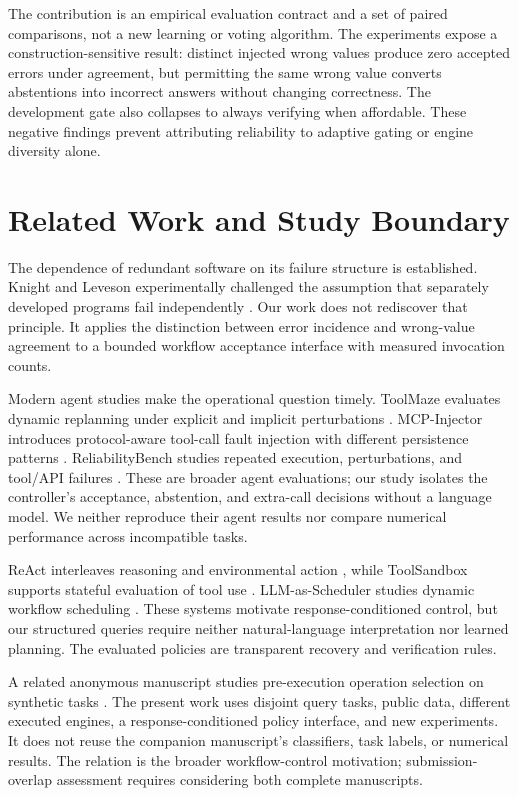 \documentclass{svproc}
\begin{document}
The contribution is an empirical evaluation contract and a set of paired comparisons, not a new learning or voting algorithm. The experiments expose a construction-sensitive result: distinct injected wrong values produce zero accepted errors under agreement, but permitting the same wrong value converts abstentions into incorrect answers without changing correctness. The development gate also collapses to always verifying when affordable. These negative findings prevent attributing reliability to adaptive gating or engine diversity alone.

\section{Related Work and Study Boundary}
The dependence of redundant software on its failure structure is established. Knight and Leveson experimentally challenged the assumption that separately developed programs fail independently \cite{knight1986}. Our work does not rediscover that principle. It applies the distinction between error incidence and wrong-value agreement to a bounded workflow acceptance interface with measured invocation counts.

Modern agent studies make the operational question timely. ToolMaze evaluates dynamic replanning under explicit and implicit perturbations \cite{toolmaze2026}. MCP-Injector introduces protocol-aware tool-call fault injection with different persistence patterns \cite{mcp2026}. ReliabilityBench studies repeated execution, perturbations, and tool/API failures \cite{reliability2026}. These are broader agent evaluations; our study isolates the controller's acceptance, abstention, and extra-call decisions without a language model. We neither reproduce their agent results nor compare numerical performance across incompatible tasks.

ReAct interleaves reasoning and environmental action \cite{yao2023react}, while ToolSandbox supports stateful evaluation of tool use \cite{lu2025toolsandbox}. LLM-as-Scheduler studies dynamic workflow scheduling \cite{xiang2026scheduler}. These systems motivate response-conditioned control, but our structured queries require neither natural-language interpretation nor learned planning. The evaluated policies are transparent recovery and verification rules.

A related anonymous manuscript studies pre-execution operation selection on synthetic tasks \cite{relatedSubmission}. The present work uses disjoint query tasks, public data, different executed engines, a response-conditioned policy interface, and new experiments. It does not reuse the companion manuscript's classifiers, task labels, or numerical results. The relation is the broader workflow-control motivation; submission-overlap assessment requires considering both complete manuscripts.
\end{document}
